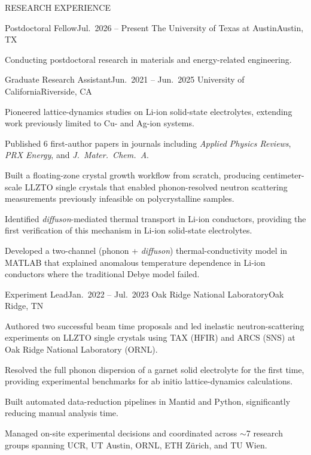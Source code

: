 \documentclass{resume} %
\begin{document}

\begin{rSection}{RESEARCH EXPERIENCE}

\begin{rSubsection}
{Postdoctoral Fellow}{Jul.\ 2026 -- Present}
{The University of Texas at Austin}{Austin, TX}
\item Conducting postdoctoral research in materials and energy-related engineering.
\end{rSubsection}

\begin{rSubsection}
{Graduate Research Assistant}{Jun.\ 2021 -- Jun.\ 2025}
{University of California}{Riverside, CA}
\item Pioneered lattice-dynamics studies on Li-ion solid-state electrolytes, extending work previously limited to Cu- and Ag-ion systems.
\item Published 6 first-author papers in journals including \textit{Applied Physics Reviews}, \textit{PRX Energy}, and \textit{J.\ Mater.\ Chem.\ A}.
\item Built a floating-zone crystal growth workflow from scratch, producing centimeter-scale LLZTO single crystals that enabled phonon-resolved neutron scattering measurements previously infeasible on polycrystalline samples.
\item Identified \textit{diffuson}-mediated thermal transport in Li-ion conductors, providing the first verification of this mechanism in Li-ion solid-state electrolytes.
\item Developed a two-channel (phonon + \textit{diffuson}) thermal-conductivity model in MATLAB that explained anomalous temperature dependence in Li-ion conductors where the traditional Debye model failed.
\end{rSubsection}

\begin{rSubsection}
{Experiment Lead}{Jan.\ 2022 -- Jul.\ 2023}
{Oak Ridge National Laboratory}{Oak Ridge, TN}
\item Authored two successful beam time proposals and led inelastic neutron-scattering experiments on LLZTO single crystals using TAX (HFIR) and ARCS (SNS) at Oak Ridge National Laboratory (ORNL).
\item Resolved the full phonon dispersion of a garnet solid electrolyte for the first time, providing experimental benchmarks for ab initio lattice-dynamics calculations.
\item Built automated data-reduction pipelines in Mantid and Python, significantly reducing manual analysis time.
\item Managed on-site experimental decisions and coordinated across $\sim$7 research groups spanning UCR, UT Austin, ORNL, ETH Z\"{u}rich, and TU Wien.
\end{rSubsection}


\end{rSection}
\end{document}

